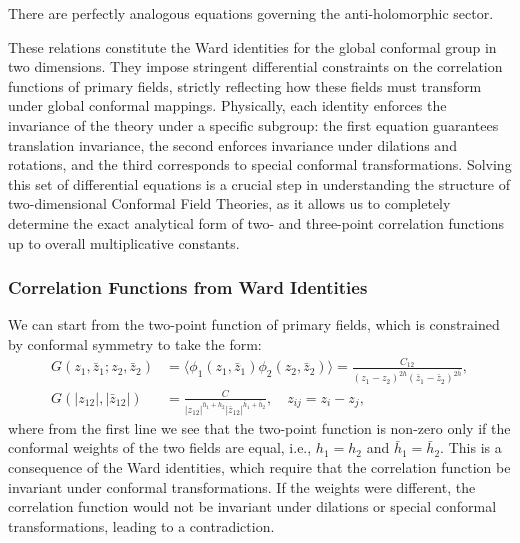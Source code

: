 There are perfectly analogous equations governing the anti-holomorphic sector.

These relations constitute the Ward identities for the global conformal group in two dimensions. They impose stringent differential constraints on the correlation functions of primary fields, strictly reflecting how these fields must transform under global conformal mappings. Physically, each identity enforces the invariance of the theory under a specific subgroup: the first equation guarantees translation invariance, the second enforces invariance under dilations and rotations, and the third corresponds to special conformal transformations. Solving this set of differential equations is a crucial step in understanding the structure of two-dimensional Conformal Field Theories, as it allows us to completely determine the exact analytical form of two- and three-point correlation functions up to overall multiplicative constants.

\subsubsection{Correlation Functions from Ward Identities}

We can start from the two-point function of primary fields, which is constrained by conformal symmetry to take the form:
\[
    \begin{aligned}
        G(z_1,\bar{z}_1; z_2,\bar{z}_2)                 & = \langle \phi_1(z_1,\bar{z}_1) \phi_2(z_2,\bar{z}_2) \rangle = \frac{C_{12}}{(z_1 - z_2)^{2h} (\bar{z}_1 - \bar{z}_2)^{2\bar{h}}}, \\
        G(\vert z_{12} \vert, \vert \bar{z}_{12} \vert) & = \frac{C}{\vert z_{12} \vert^{h_1 + h_2} \vert \bar{z}_{12} \vert^{\bar{h}_1 + \bar{h}_2}}, \quad z_{ij} = z_i - z_j,
    \end{aligned}
\]
where from the first line we see that the two-point function is non-zero only if the conformal weights of the two fields are equal, i.e., $h_1 = h_2$ and $\bar{h}_1 = \bar{h}_2$. This is a consequence of the Ward identities, which require that the correlation function be invariant under conformal transformations. If the weights were different, the correlation function would not be invariant under dilations or special conformal transformations, leading to a contradiction.

